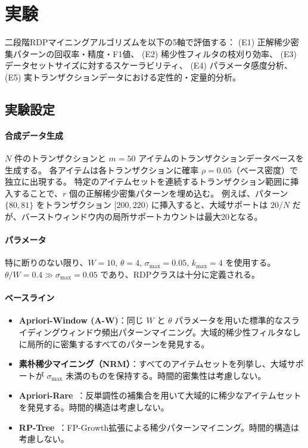 \section{実験}\label{sec:experiments}

二段階RDPマイニングアルゴリズムを以下の5軸で評価する：
(E1) 正解稀少密集パターンの回収率・精度・F1値、
(E2) 稀少性フィルタの枝刈り効率、
(E3) データセットサイズに対するスケーラビリティ、
(E4) パラメータ感度分析、
(E5) 実トランザクションデータにおける定性的・定量的分析。

\subsection{実験設定}

\paragraph{合成データ生成}
$N$ 件のトランザクションと $m = 50$ アイテムのトランザクションデータベースを生成する。
各アイテムは各トランザクションに確率 $\rho = 0.05$（ベース密度）で独立に出現する。
特定のアイテムセットを連続するトランザクション範囲に挿入することで、$r$ 個の正解稀少密集パターンを埋め込む。
例えば、パターン $\{80, 81\}$ をトランザクション $[200, 220)$ に挿入すると、大域サポートは $20/N$ だが、バーストウィンドウ内の局所サポートカウントは最大20となる。

\paragraph{パラメータ}
特に断りのない限り、$W = 10$, $\theta = 4$, $\sigma_{\max} = 0.05$, $k_{\max} = 4$ を使用する。
$\theta/W = 0.4 \gg \sigma_{\max} = 0.05$ であり、RDPクラスは十分に定義される。

\paragraph{ベースライン}
\begin{itemize}
\item \textbf{Apriori-Window (A-W)}：同じ $W$ と $\theta$ パラメータを用いた標準的なスライディングウィンドウ頻出パターンマイニング。大域的稀少性フィルタなしに局所的に密集するすべてのパターンを発見する。
\item \textbf{素朴稀少マイニング（NRM）}：すべてのアイテムセットを列挙し、大域サポートが $\sigma_{\max}$ 未満のものを保持する。時間的密集性は考慮しない。
\item \textbf{Apriori-Rare}~\cite{szathmary2007rare}：反単調性の補集合を用いて大域的に稀少なアイテムセットを発見する。時間的構造は考慮しない。
\item \textbf{RP-Tree}~\cite{tsang2011rptree}：FP-Growth拡張による稀少パターンマイニング。時間的構造は考慮しない。
\end{itemize}

